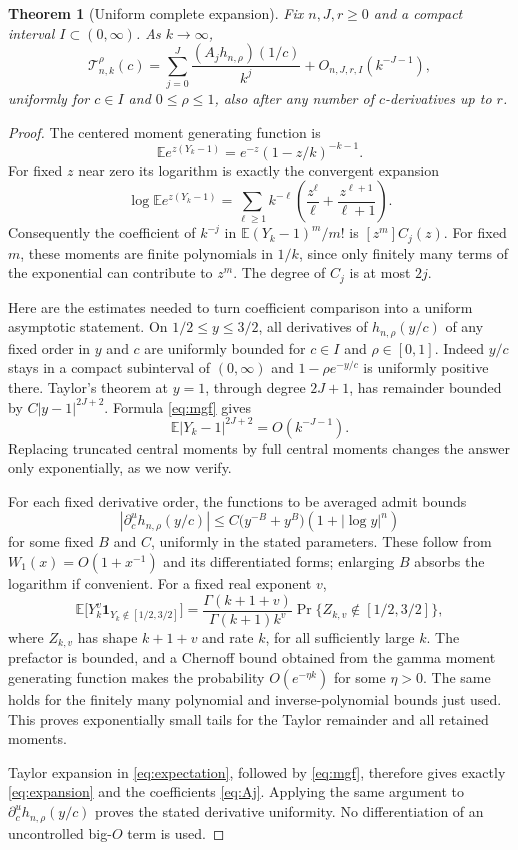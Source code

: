\documentclass[11pt]{article}
\newtheorem{theorem}{Theorem}[section]
\theoremstyle{definition}
\theoremstyle{remark}
\newcommand{\EE}{\mathbb E}
\newcommand{\Tcal}{\mathcal T}
\begin{document}
\begin{theorem}[Uniform complete expansion]\label{thm:expansion}
Fix $n,J,r\geq0$ and a compact interval $I\subset(0,\infty)$. As $k\to\infty$,
\begin{equation}\label{eq:expansion}
 \Tcal_{n,k}^{\rho}(c)
   =\sum_{j=0}^J\frac{(A_jh_{n,\rho})(1/c)}{k^j}
          +O_{n,J,r,I}(k^{-J-1}),
\end{equation}
uniformly for $c\in I$ and $0\leq\rho\leq1$, also after any number of $c$-derivatives up to $r$.
\end{theorem}
\begin{proof}
The centered moment generating function is
\[
 \EE e^{z(Y_k-1)}=e^{-z}(1-z/k)^{-k-1}.
\]
For fixed $z$ near zero its logarithm is exactly the convergent expansion
\begin{equation}\label{eq:mgf}
 \log\EE e^{z(Y_k-1)}
  =\sum_{\ell\geq1}k^{-\ell}
       \left(\frac{z^\ell}{\ell}+\frac{z^{\ell+1}}{\ell+1}\right).
\end{equation}
Consequently the coefficient of $k^{-j}$ in
$\EE(Y_k-1)^m/m!$ is $[z^m]C_j(z)$. For fixed $m$, these moments are finite polynomials in $1/k$, since only finitely many terms of the exponential can contribute to $z^m$. The degree of $C_j$ is at most $2j$.

Here are the estimates needed to turn coefficient comparison into a uniform asymptotic statement. On $1/2\leq y\leq3/2$, all derivatives of $h_{n,\rho}(y/c)$ of any fixed order in $y$ and $c$ are uniformly bounded for $c\in I$ and $\rho\in[0,1]$. Indeed $y/c$ stays in a compact subinterval of $(0,\infty)$ and $1-\rho e^{-y/c}$ is uniformly positive there. Taylor's theorem at $y=1$, through degree $2J+1$, has remainder bounded by $C|y-1|^{2J+2}$. Formula \eqref{eq:mgf} gives
\[
 \EE|Y_k-1|^{2J+2}=O(k^{-J-1}).
\]
Replacing truncated central moments by full central moments changes the answer only exponentially, as we now verify.

For each fixed derivative order, the functions to be averaged admit bounds
\[
 |\partial_c^u h_{n,\rho}(y/c)|
    \leq C\bigl(y^{-B}+y^B\bigr)(1+|\log y|^n)
\]
for some fixed $B$ and $C$, uniformly in the stated parameters. These follow from $W_1(x)=O(1+x^{-1})$ and its differentiated forms; enlarging $B$ absorbs the logarithm if convenient. For a fixed real exponent $v$,
\[
 \EE\bigl[Y_k^v\mathbf1_{Y_k\notin[1/2,3/2]}\bigr]
 =\frac{\Gamma(k+1+v)}{\Gamma(k+1)k^v}
   \Pr\{Z_{k,v}\notin[1/2,3/2]\},
\]
where $Z_{k,v}$ has shape $k+1+v$ and rate $k$, for all sufficiently large $k$. The prefactor is bounded, and a Chernoff bound obtained from the gamma moment generating function makes the probability $O(e^{-\eta k})$ for some $\eta>0$. The same holds for the finitely many polynomial and inverse-polynomial bounds just used. This proves exponentially small tails for the Taylor remainder and all retained moments.

Taylor expansion in \eqref{eq:expectation}, followed by \eqref{eq:mgf}, therefore gives exactly \eqref{eq:expansion} and the coefficients \eqref{eq:Aj}. Applying the same argument to $\partial_c^u h_{n,\rho}(y/c)$ proves the stated derivative uniformity. No differentiation of an uncontrolled big-$O$ term is used.
\end{proof}
\end{document}

